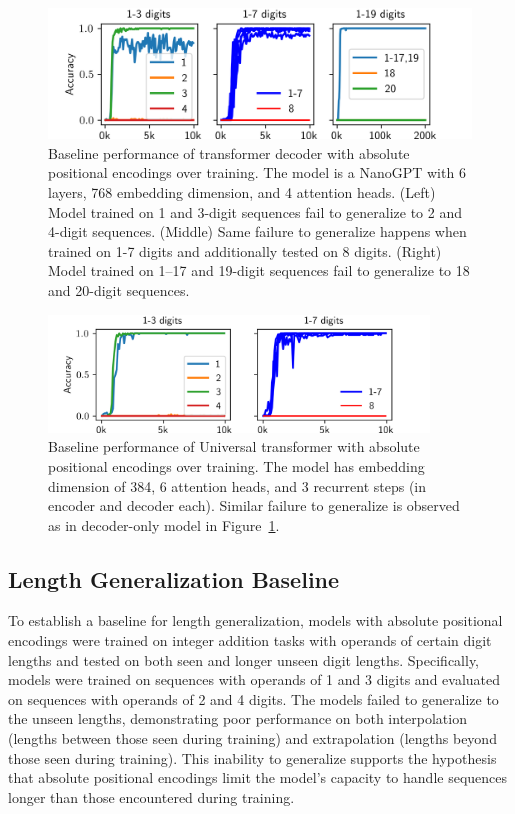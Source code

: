 \begin{figure}[!h]
  \centering
  \includegraphics[width=\textwidth]{fig/baseline_and_longer.png}
  \caption{Baseline performance of transformer decoder with absolute positional encodings over training. The model is a NanoGPT with 6 layers, 768 embedding dimension, and 4 attention heads. (Left) Model trained on 1 and 3-digit sequences fail to generalize to 2 and 4-digit sequences. (Middle) Same failure to generalize happens when trained on 1-7 digits and additionally tested on 8 digits. (Right) Model trained on 1--17 and 19-digit sequences fail to generalize to 18 and 20-digit sequences.}
  \label{fig:baseline_and_longer}
\end{figure}

\begin{figure}[!h]
  \centering
  \includegraphics[width=0.9\textwidth]{fig/baseline_and_longer_ut.png}
  \caption{Baseline performance of Universal transformer with absolute positional encodings over training. The model has embedding dimension of 384, 6 attention heads, and 3 recurrent steps (in encoder and decoder each). Similar failure to generalize is observed as in decoder-only model in Figure~\ref{fig:baseline_and_longer}.}
  \label{fig:baseline_and_longer_ut}
\end{figure}

\subsection{Length Generalization Baseline}\label{subsec:length_generalization_baseline}

To establish a baseline for length generalization, models with absolute positional encodings were trained on integer addition tasks with operands of certain digit lengths and tested on both seen and longer unseen digit lengths. Specifically, models were trained on sequences with operands of 1 and 3 digits and evaluated on sequences with operands of 2 and 4 digits. The models failed to generalize to the unseen lengths, demonstrating poor performance on both interpolation (lengths between those seen during training) and extrapolation (lengths beyond those seen during training). This inability to generalize supports the hypothesis that absolute positional encodings limit the model's capacity to handle sequences longer than those encountered during training.

